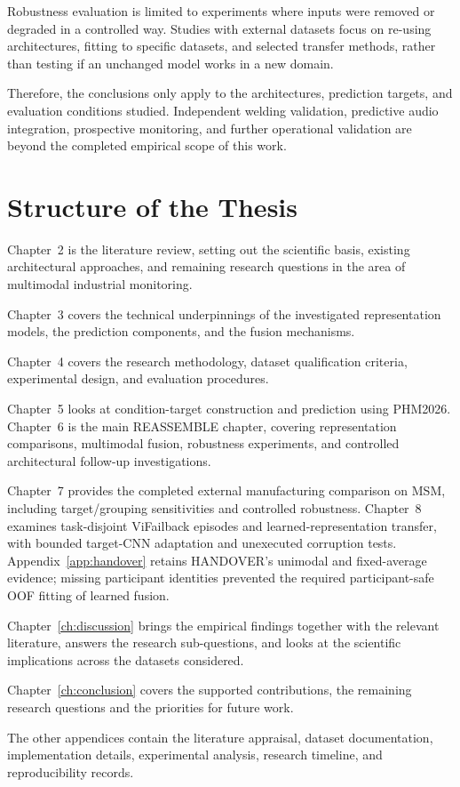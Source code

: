 Robustness evaluation is limited to experiments where inputs
were removed or degraded in a controlled way. Studies with
external datasets focus on re-using architectures, fitting to
specific datasets, and selected transfer methods, rather than
testing if an unchanged model works in a new domain.

Therefore, the conclusions only apply to the architectures,
prediction targets, and evaluation conditions studied. Independent
welding validation, predictive audio integration, prospective
monitoring, and further operational validation are beyond the
completed empirical scope of this work.



\section{Structure of the Thesis}

Chapter~2 is the literature review, setting out the scientific
basis, existing architectural approaches, and remaining research
questions in the area of multimodal industrial monitoring.

Chapter~3 covers the technical underpinnings of the investigated
representation models, the prediction components, and the fusion
mechanisms.

Chapter~4 covers the research methodology, dataset qualification
criteria, experimental design, and evaluation procedures.

Chapter~5 looks at condition-target construction and prediction
using PHM2026. Chapter~6 is the main REASSEMBLE chapter, covering
representation comparisons, multimodal fusion, robustness
experiments, and controlled architectural follow-up investigations.

Chapter~7 provides the completed external manufacturing comparison on MSM, including
target/grouping sensitivities and controlled robustness. Chapter~8 examines task-disjoint
ViFailback episodes and learned-representation transfer, with bounded target-CNN
adaptation and unexecuted corruption tests. Appendix~\ref{app:handover} retains HANDOVER's
unimodal and fixed-average evidence; missing participant identities prevented the
required participant-safe OOF fitting of learned fusion.

Chapter~\ref{ch:discussion} brings the empirical findings together
with the relevant literature, answers the research sub-questions,
and looks at the scientific implications across the datasets
considered.

Chapter~\ref{ch:conclusion} covers the supported contributions,
the remaining research questions and the priorities for future work.

The other appendices contain the literature appraisal, dataset
documentation, implementation details, experimental analysis,
research timeline, and reproducibility records.
